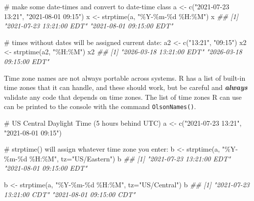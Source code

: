 \documentclass[
  13,
  letterpaper,
]{report}
\newenvironment{Shaded}{\begin{snugshade}}{\end{snugshade}}
\newcommand{\AttributeTok}[1]{\textcolor[rgb]{0.40,0.45,0.13}{#1}}
\newcommand{\CommentTok}[1]{\textcolor[rgb]{0.37,0.37,0.37}{#1}}
\newcommand{\DocumentationTok}[1]{\textcolor[rgb]{0.37,0.37,0.37}{\textit{#1}}}
\newcommand{\FunctionTok}[1]{\textcolor[rgb]{0.28,0.35,0.67}{#1}}
\newcommand{\NormalTok}[1]{\textcolor[rgb]{0.00,0.23,0.31}{#1}}
\newcommand{\OtherTok}[1]{\textcolor[rgb]{0.00,0.23,0.31}{#1}}
\newcommand{\StringTok}[1]{\textcolor[rgb]{0.13,0.47,0.30}{#1}}
\begin{document}
\begin{Shaded}
\begin{Highlighting}[]

\CommentTok{\# make some date{-}times and convert to date{-}time class}
\NormalTok{a }\OtherTok{\textless{}{-}} \FunctionTok{c}\NormalTok{(}\StringTok{"2021{-}07{-}23 13:21"}\NormalTok{, }\StringTok{"2021{-}08{-}01 09:15"}\NormalTok{)}
\NormalTok{x }\OtherTok{\textless{}{-}} \FunctionTok{strptime}\NormalTok{(a, }\StringTok{"\%Y{-}\%m{-}\%d \%H:\%M"}\NormalTok{)}
\NormalTok{x}
\DocumentationTok{\#\# [1] "2021{-}07{-}23 13:21:00 EDT" "2021{-}08{-}01 09:15:00 EDT"}

\CommentTok{\# times without dates will be assigned current date:}
\NormalTok{a2 }\OtherTok{\textless{}{-}} \FunctionTok{c}\NormalTok{(}\StringTok{"13:21"}\NormalTok{, }\StringTok{"09:15"}\NormalTok{)}
\NormalTok{x2 }\OtherTok{\textless{}{-}} \FunctionTok{strptime}\NormalTok{(a2, }\StringTok{"\%H:\%M"}\NormalTok{)}
\NormalTok{x2}
\DocumentationTok{\#\# [1] "2026{-}03{-}18 13:21:00 EDT" "2026{-}03{-}18 09:15:00 EDT"}
\end{Highlighting}
\end{Shaded}

Time zone names are not always portable across systems. R has a list of
built-in time zones that it can handle, and these should work, but be
careful and \textbf{\emph{always}} validate any code that depends on
time zones. The list of time zones R can use can be printed to the
console with the command \texttt{OlsonNames()}.

\begin{Shaded}
\begin{Highlighting}[]

\CommentTok{\# US Central Daylight Time (5 hours behind UTC)}
\NormalTok{a }\OtherTok{\textless{}{-}} \FunctionTok{c}\NormalTok{(}\StringTok{"2021{-}07{-}23 13:21"}\NormalTok{, }\StringTok{"2021{-}08{-}01 09:15"}\NormalTok{)}

\CommentTok{\# strptime() will assign whatever time zone you enter:}
\NormalTok{b }\OtherTok{\textless{}{-}} \FunctionTok{strptime}\NormalTok{(a, }\StringTok{"\%Y{-}\%m{-}\%d \%H:\%M"}\NormalTok{, }\AttributeTok{tz=}\StringTok{"US/Eastern"}\NormalTok{)}
\NormalTok{b}
\DocumentationTok{\#\# [1] "2021{-}07{-}23 13:21:00 EDT" "2021{-}08{-}01 09:15:00 EDT"}

\NormalTok{b }\OtherTok{\textless{}{-}} \FunctionTok{strptime}\NormalTok{(a, }\StringTok{"\%Y{-}\%m{-}\%d \%H:\%M"}\NormalTok{, }\AttributeTok{tz=}\StringTok{"US/Central"}\NormalTok{)}
\NormalTok{b}
\DocumentationTok{\#\# [1] "2021{-}07{-}23 13:21:00 CDT" "2021{-}08{-}01 09:15:00 CDT"}
\end{Highlighting}
\end{Shaded}
\end{document}
